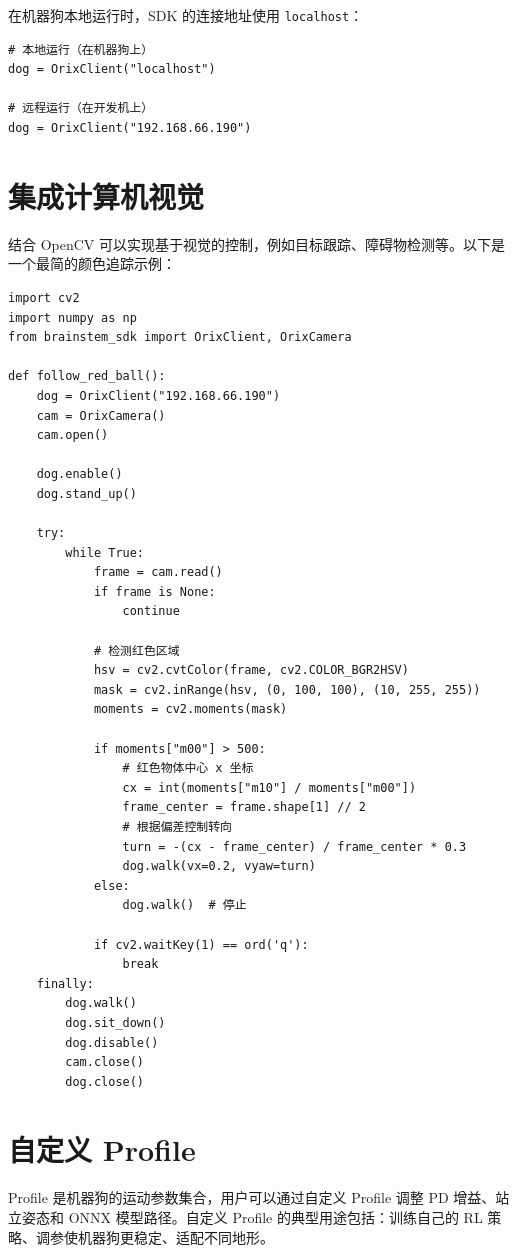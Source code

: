 \documentclass[a4paper,11pt,openany]{book}
\begin{document}
在机器狗本地运行时，SDK 的连接地址使用 \texttt{localhost}：

\begin{lstlisting}[style=python]
# 本地运行（在机器狗上）
dog = OrixClient("localhost")

# 远程运行（在开发机上）
dog = OrixClient("192.168.66.190")
\end{lstlisting}

\section{集成计算机视觉}

结合 OpenCV 可以实现基于视觉的控制，例如目标跟踪、障碍物检测等。以下是一个最简的颜色追踪示例：

\begin{lstlisting}[style=python]
import cv2
import numpy as np
from brainstem_sdk import OrixClient, OrixCamera

def follow_red_ball():
    dog = OrixClient("192.168.66.190")
    cam = OrixCamera()
    cam.open()

    dog.enable()
    dog.stand_up()

    try:
        while True:
            frame = cam.read()
            if frame is None:
                continue

            # 检测红色区域
            hsv = cv2.cvtColor(frame, cv2.COLOR_BGR2HSV)
            mask = cv2.inRange(hsv, (0, 100, 100), (10, 255, 255))
            moments = cv2.moments(mask)

            if moments["m00"] > 500:
                # 红色物体中心 x 坐标
                cx = int(moments["m10"] / moments["m00"])
                frame_center = frame.shape[1] // 2
                # 根据偏差控制转向
                turn = -(cx - frame_center) / frame_center * 0.3
                dog.walk(vx=0.2, vyaw=turn)
            else:
                dog.walk()  # 停止

            if cv2.waitKey(1) == ord('q'):
                break
    finally:
        dog.walk()
        dog.sit_down()
        dog.disable()
        cam.close()
        dog.close()
\end{lstlisting}

\section{自定义 Profile}

Profile 是机器狗的运动参数集合，用户可以通过自定义 Profile 调整 PD 增益、站立姿态和 ONNX 模型路径。自定义 Profile 的典型用途包括：训练自己的 RL 策略、调参使机器狗更稳定、适配不同地形。
\end{document}
